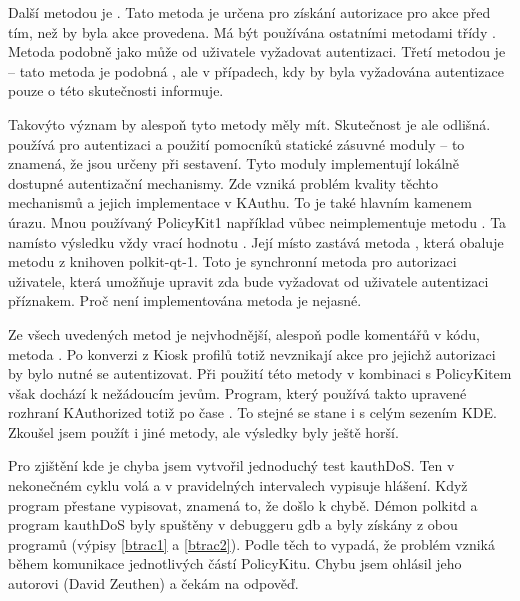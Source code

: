 Další metodou je . Tato metoda je určena pro získání autorizace pro akce před tím, než by byla akce provedena. Má být používána ostatními metodami třídy .  Metoda podobně jako  může od uživatele vyžadovat autentizaci. Třetí metodou je  -- tato metoda je podobná , ale v případech, kdy by byla vyžadována autentizace pouze o této skutečnosti
informuje.

Takovýto význam by alespoň tyto metody měly mít. Skutečnost je ale odlišná.  používá pro autentizaci a použití pomocníků statické zásuvné moduly -- to znamená, že jsou určeny při sestavení. Tyto moduly implementují lokálně dostupné autentizační mechanismy. Zde vzniká problém kvality těchto mechanismů a jejich implementace v KAuthu. To je také hlavním kamenem úrazu. Mnou používaný PolicyKit1 například vůbec neimplementuje metodu . Ta namísto výsledku vždy vrací hodnotu . Její místo zastává metoda , která obaluje metodu  z knihoven polkit-qt-1. Toto je synchronní metoda pro autorizaci uživatele, která umožňuje upravit zda bude vyžadovat od uživatele autentizaci příznakem. Proč není implementována metoda  je nejasné.

Ze všech uvedených metod je nejvhodnější, alespoň podle komentářů v kódu, metoda . Po konverzi z Kiosk profilů totiž nevznikají akce pro jejichž autorizaci by bylo nutné se autentizovat. Při použití této metody v kombinaci s PolicyKitem však dochází k nežádoucím jevům. Program, který používá takto upravené rozhraní KAuthorized totiž po čase . To stejné se stane i s celým sezením KDE. Zkoušel jsem použít i jiné metody, ale výsledky byly ještě horší.

Pro zjištění kde je chyba jsem vytvořil jednoduchý test kauthDoS. Ten v nekonečném cyklu volá  a v pravidelných intervalech vypisuje hlášení. Když program přestane vypisovat, znamená to, že došlo k chybě. Démon polkitd a program kauthDoS byly spuštěny v debuggeru gdb a byly získány  z obou programů (výpisy \ref{btrac1} a \ref{btrac2}). Podle těch to vypadá, že problém vzniká během komunikace jednotlivých částí PolicyKitu. Chybu jsem ohlásil jeho autorovi (David Zeuthen) a čekám na odpověď.

